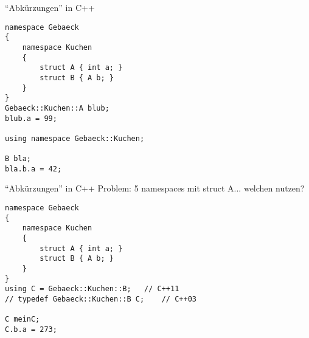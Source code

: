 

\begin{frame}[fragile]{\enquote{Abkürzungen} in C++}
	
	\begin{lstlisting}[]
namespace Gebaeck
{
	namespace Kuchen
	{
        struct A { int a; }
        struct B { A b; }
	}
}
Gebaeck::Kuchen::A blub;
blub.a = 99;

using namespace Gebaeck::Kuchen;

B bla;
bla.b.a = 42;
	\end{lstlisting}
\end{frame}

\begin{frame}[fragile]{\enquote{Abkürzungen} in C++}
	Problem: 5 namespaces mit struct A... welchen nutzen?

	\begin{lstlisting}[]
namespace Gebaeck
{
	namespace Kuchen
	{
        struct A { int a; }
        struct B { A b; }
	}
}
using C = Gebaeck::Kuchen::B;	// C++11
// typedef Gebaeck::Kuchen::B C;	// C++03

C meinC;
C.b.a = 273;
	\end{lstlisting}
\end{frame}


